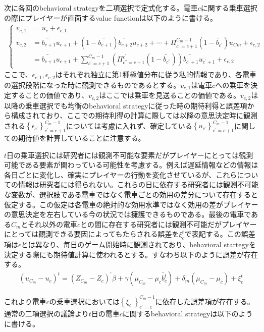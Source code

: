 \documentclass{jsarticle}
\begin{document}
次に各回のbehavioral strategyを二項選択で定式化する。電車$c$に関する乗車選択の際にプレイヤーが直面するvalue functionは以下のように書ける。
\begin{align*}
	\begin{cases}
	v_{c, 1} &= u_c + \epsilon_{c, 1}\\[8pt]
	v_{c, 2} &= \tilde{b_{c+1}} u_{c+1} + (1 - \tilde{b_{c+1}}) \tilde{b_{c+2}} u_{c+2} + \cdots + \Pi_{c^{'} = c+1}^{C_m-1}(1 - \tilde{b_{c^{'}}}) u_{Cm} + \epsilon_{c, 2}\\[8pt]
	&= \tilde{b_{c+1}} u_{c+1} + \sum_{c^{'}=c+1}^{C_m-1} \left( \Pi_{c^{''} = c+1}^{c^{'}} (1 - \tilde{b_{c^{''}}}) \right) \tilde{b_{c^{'} + 1}} u_{c^{'} + 1} + \epsilon_{c, 2}
	\end{cases}
\end{align*}
ここで、$\epsilon_{c, 1}, \epsilon_{c, 2}$はそれぞれ独立に第1種極値分布に従う私的情報であり、各電車の選択段階になった時に観測できるものであるとする。$v_{c, 1}$は電車$c$への乗車を決定することの価値であり、$v_{c, 2}$はここでは乗車を見送ることの価値である。$v_{c, 2}$は以降の乗車選択でも均衡のbehavioral strategyに従った時の期待利得と誤差項から構成されており、ここでの期待利得の計算に際しては以降の意思決定時に観測される$\left\{ \epsilon_{c^{'}} \right\}_{c^{'} = c+1}^{C_m-1}$については考慮に入れず、確定している$\left\{ u_{c^{'}} \right\}_{c^{'} = c+1}^{C_m-1}$に関しての期待値を計算していることに注意する。

$t$日の乗車選択には研究者には観測不可能な要素だがプレイヤーにとっては観測可能である要素が関わっている可能性を考慮する。例えば遅延情報などの情報は各日ごとに変化し、確実にプレイヤーの行動を変化させているが、これらについての情報は研究者には得られない。これらの日に依存する研究者には観測不可能な変数が、選択肢である電車ではなく電車ごとの効用の差分について存在すると仮定する。この仮定は各電車の絶対的な効用水準ではなく効用の差がプレイヤーの意思決定を左右している今の状況では擁護できるものである。最後の電車である$C_m$とそれ以外の電車$c$との間に存在する研究者には観測不可能だがプレイヤーにとっては観測できる要因によってもたらされる誤差を$\xi_c^t$で表記する。この誤差項は$\epsilon$とは異なり、毎日のゲーム開始時に観測されており、behavioral startegyを決定する際にも期待値計算に使われるとする。すなわち以下のように誤差が存在する。
\begin{align*}
	(u_{C_m} - u_c)^t = (Z_{C_m} - Z_c)^{'} \beta + \gamma (\mu_{C_m} - \mu_{c} \tilde{b_c^t}) + \delta_m (\mu_{C_m} - \mu_c) + \xi_c^t
\end{align*}

これより電車$c$の乗車選択においては$\left\{ \xi_{c^{'}} \right\}_{c^{'} = c}^{C_m-1}$に依存した誤差項が存在する。通常の二項選択の議論より$t$日の電車$c$に関するbehavioral strategyは以下のように書ける。
\end{document}
